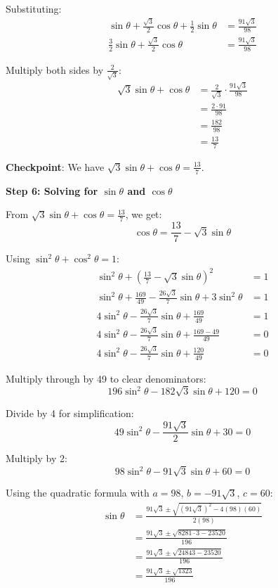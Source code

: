 \documentclass[12pt]{article}
\begin{document}
\begin{solutionbox}
Substituting:
\begin{align*}
    \sin\theta + \frac{\sqrt{3}}{2}\cos\theta + \frac{1}{2}\sin\theta &= \frac{91\sqrt{3}}{98} \\
    \frac{3}{2}\sin\theta + \frac{\sqrt{3}}{2}\cos\theta &= \frac{91\sqrt{3}}{98}
\end{align*}

Multiply both sides by $\frac{2}{\sqrt{3}}$:
\begin{align*}
    \sqrt{3}\sin\theta + \cos\theta &= \frac{2}{\sqrt{3}} \cdot \frac{91\sqrt{3}}{98} \\
    &= \frac{2 \cdot 91}{98} \\
    &= \frac{182}{98} \\
    &= \frac{13}{7}
\end{align*}

\textbf{Checkpoint}: We have $\sqrt{3}\sin\theta + \cos\theta = \frac{13}{7}$.

\vspace{0.3cm}

\textbf{Step 6: Solving for $\sin\theta$ and $\cos\theta$}

From $\sqrt{3}\sin\theta + \cos\theta = \frac{13}{7}$, we get:
$$\cos\theta = \frac{13}{7} - \sqrt{3}\sin\theta$$

Using $\sin^2\theta + \cos^2\theta = 1$:
\begin{align*}
    \sin^2\theta + \left(\frac{13}{7} - \sqrt{3}\sin\theta\right)^2 &= 1 \\
    \sin^2\theta + \frac{169}{49} - \frac{26\sqrt{3}}{7}\sin\theta + 3\sin^2\theta &= 1 \\
    4\sin^2\theta - \frac{26\sqrt{3}}{7}\sin\theta + \frac{169}{49} &= 1 \\
    4\sin^2\theta - \frac{26\sqrt{3}}{7}\sin\theta + \frac{169 - 49}{49} &= 0 \\
    4\sin^2\theta - \frac{26\sqrt{3}}{7}\sin\theta + \frac{120}{49} &= 0
\end{align*}

Multiply through by 49 to clear denominators:
$$196\sin^2\theta - 182\sqrt{3}\sin\theta + 120 = 0$$

Divide by 4 for simplification:
$$49\sin^2\theta - \frac{91\sqrt{3}}{2}\sin\theta + 30 = 0$$

Multiply by 2:
$$98\sin^2\theta - 91\sqrt{3}\sin\theta + 60 = 0$$

Using the quadratic formula with $a = 98$, $b = -91\sqrt{3}$, $c = 60$:
\begin{align*}
    \sin\theta &= \frac{91\sqrt{3} \pm \sqrt{(91\sqrt{3})^2 - 4(98)(60)}}{2(98)} \\
    &= \frac{91\sqrt{3} \pm \sqrt{8281 \cdot 3 - 23520}}{196} \\
    &= \frac{91\sqrt{3} \pm \sqrt{24843 - 23520}}{196} \\
    &= \frac{91\sqrt{3} \pm \sqrt{1323}}{196}
\end{align*}


\end{solutionbox}
\end{document}
